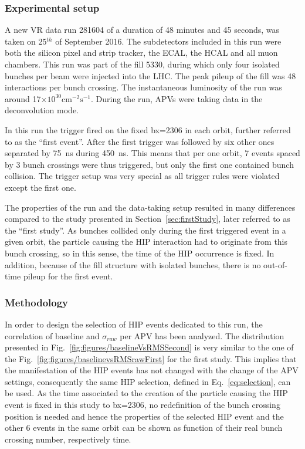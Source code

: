 
\subsubsection{Experimental setup}

A new VR data run 281604 of a duration of 48 minutes and 45 seconds, was taken on 25$^{th}$ of September 2016. The subdetectors included in this run were both the silicon pixel and strip tracker, the ECAL, the HCAL and all muon chambers. This run was part of the fill 5330, during which only four isolated bunches per beam were injected into the LHC. The peak pileup of the fill was 48 interactions per bunch crossing. The instantaneous luminosity of the run was around 17$\times 10^{30} \mathrm{cm^{-2} s^{-1}}$. During the run, APVs were taking data in the deconvolution mode. 

In this run the trigger fired on the fixed bx=2306 in each orbit, further referred to as the ``first event''. After the first trigger was followed by six other ones separated by 75~ns during 450~ns. This means that per one orbit, 7 events spaced by 3 bunch crossings were thus triggered, but only the first one contained bunch collision. The trigger setup was very special as all trigger rules were violated except the first one.


The properties of the run and  the data-taking setup resulted in many differences compared to the study presented in Section~\ref{sec:firstStudy}, later referred to as the ``first study''. As bunches collided only during the first triggered event in a given orbit, the particle causing the HIP interaction had to originate from this bunch crossing, so in this sense, the time of the HIP occurrence is fixed. In addition, because of the fill structure with isolated bunches, there is no out-of-time pileup for the first event.

\subsubsection{Methodology}

In order to design the selection of HIP events dedicated to this run, the correlation of baseline and $\sigma_{raw}$ per APV has been analyzed. The distribution presented in Fig.~\ref{fig:figures/baselineVsRMSSecond} is very similar to the one of the Fig.~\ref{fig:figures/baselinevsRMSrawFirst} for the first study. This implies that the manifestation of the HIP events has not changed with the change of the APV settings, consequently the same HIP selection, defined in Eq.~\ref{eq:selection}, can be used. As the time associated to the creation of the particle causing the HIP event is fixed in this study to bx=2306, no redefinition of the bunch crossing position is needed and hence the properties of the selected HIP event and the other 6 events in the same orbit can be shown as function of their real bunch crossing number, respectively time.

